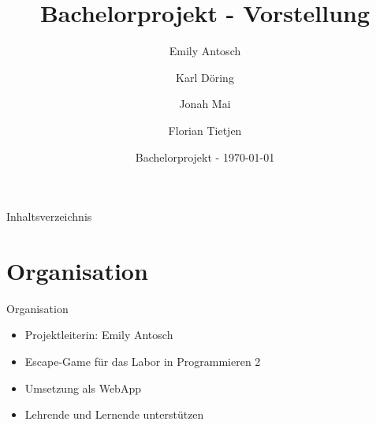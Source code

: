 \documentclass[usenames,dvipsnames,10pt]{beamer}
\title{Bachelorprojekt - Vorstellung}
\date[ISPN ’80]{Bachelorprojekt - \today}
\author{Emily Antosch \and Karl Döring \and Jonah Mai \and Florian Tietjen}
\begin{document}
    \begin{frame}
        \titlepage
    \end{frame}
    \begin{frame}{Inhaltsverzeichnis}
        \tableofcontents
    \end{frame}
    \section{Organisation}
    \begin{frame}{Organisation}
        \begin{itemize}
            \item Projektleiterin: Emily Antosch
            \pause
            \item Escape-Game für das Labor in Programmieren 2
            \pause
            \item Umsetzung als WebApp
            \pause
            \item Lehrende und Lernende unterstützen
        \end{itemize}
    \end{frame}
\end{document}
